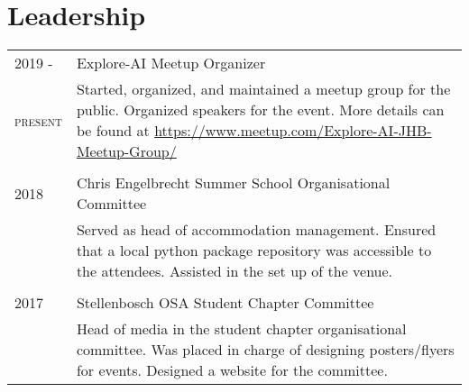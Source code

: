 \section{Leadership}

\begin{tabular}{lp{12cm}}
	2019 - & Explore-AI Meetup Organizer\\
	\textsc{present}& \small{Started, organized, and maintained a meetup group for the public. Organized speakers for the event. More details can be found at \href{https://www.meetup.com/Explore-AI-JHB-Meetup-Group/}{https://www.meetup.com/Explore-AI-JHB-Meetup-Group/}} \\
	& \\
	2018 & Chris Engelbrecht Summer School Organisational Committee \\
	& \small{Served as head of accommodation management. Ensured that a local python package repository was accessible to the attendees. Assisted in the set up of the venue.} \\
	& \\
	2017 & Stellenbosch OSA Student Chapter Committee \\
	& \small{Head of media in the student chapter organisational committee. Was placed in charge of designing posters/flyers for events. Designed a website for the committee.} \\
\end{tabular}